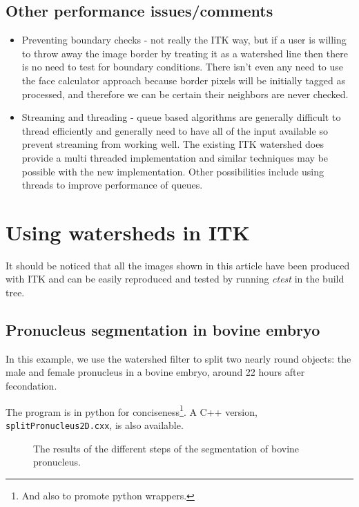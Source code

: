 \documentclass{InsightArticle}
\begin{document}
\subsection{Other performance issues/comments}
\begin{itemize}
\item Preventing boundary checks - not really the ITK way, but if a user is
willing to throw away the image border by treating it as a watershed
line then there is no need to test for boundary conditions. There
isn't even any need to use the face calculator approach because border
pixels will be initially tagged as processed, and therefore we can be
certain their neighbors are never checked.
\item Streaming and threading  - queue based algorithms are generally difficult 
to thread efficiently and generally need to have all of the input
available so prevent streaming from working well. The existing ITK
watershed does provide a multi threaded implementation and similar
techniques may be possible with the new implementation. Other
possibilities include using threads to improve performance of queues.
\end{itemize}


\section{Using watersheds in ITK}
\label{sect:using-ws-itk}

It should be noticed that all the images shown in this article have been
produced with ITK and can be easily reproduced and tested by running 
{\em ctest} in the build tree.

\subsection{Pronucleus segmentation in bovine embryo}
\label{sect:pronucleus}
In this example, we use the watershed filter to split two nearly round
objects: the male and female pronucleus in a bovine embryo, around 22
hours after fecondation.

The program is in python for conciseness\footnote{And also to promote
python wrappers.}. A C++ version, \verb$splitPronucleus2D.cxx$, is also
available.

\begin{figure}[htbp]
\begin{center}

\caption{The results of the different steps of the segmentation of bovine pronucleus.}
\end{center}
\end{figure}
\end{document}
